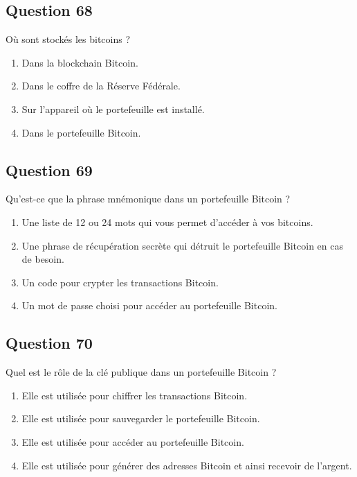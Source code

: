 \documentclass[12pt,a4paper]{article}
\begin{document}
\bigskip


\subsection*{Question 68}
Où sont stockés les bitcoins ?

\begin{enumerate}[label=\Alph*., leftmargin=*]
\item Dans la blockchain Bitcoin.
\item Dans le coffre de la Réserve Fédérale.
\item Sur l'appareil où le portefeuille est installé.
\item Dans le portefeuille Bitcoin.
\end{enumerate}

\bigskip


\subsection*{Question 69}
Qu'est-ce que la phrase mnémonique dans un portefeuille Bitcoin ?

\begin{enumerate}[label=\Alph*., leftmargin=*]
\item Une liste de 12 ou 24 mots qui vous permet d'accéder à vos bitcoins.
\item Une phrase de récupération secrète qui détruit le portefeuille Bitcoin en cas de besoin.
\item Un code pour crypter les transactions Bitcoin.
\item Un mot de passe choisi pour accéder au portefeuille Bitcoin.
\end{enumerate}

\bigskip


\subsection*{Question 70}
Quel est le rôle de la clé publique dans un portefeuille Bitcoin ?

\begin{enumerate}[label=\Alph*., leftmargin=*]
\item Elle est utilisée pour chiffrer les transactions Bitcoin.
\item Elle est utilisée pour sauvegarder le portefeuille Bitcoin.
\item Elle est utilisée pour accéder au portefeuille Bitcoin.
\item Elle est utilisée pour générer des adresses Bitcoin et ainsi recevoir de l'argent.
\end{enumerate}
\end{document}
